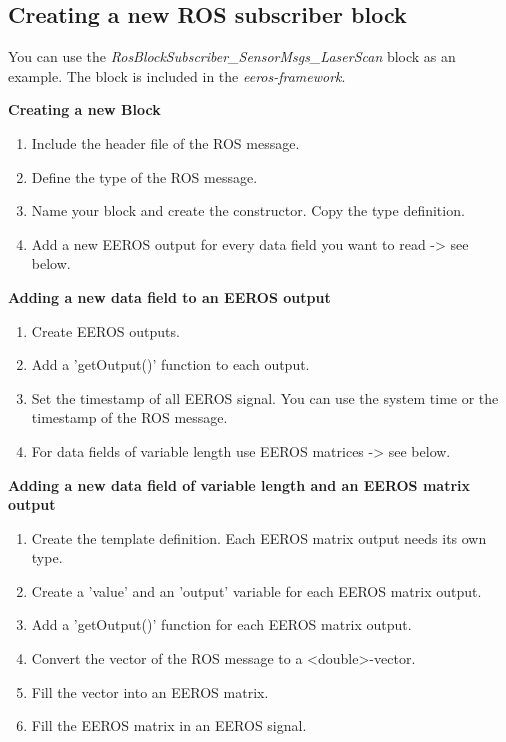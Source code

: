 \subsection{Creating a new ROS subscriber block}
\label{createRosBlock}
You can use the \textit{RosBlockSubscriber\_SensorMsgs\_LaserScan} block as an example.
The block is included in the \textit{eeros-framework}.

\textbf{Creating a new Block}
\label{creatingANewBlock}
\begin{enumerate}[\hspace{0.5cm}{A}-1]
\item Include the header file of the ROS message.
\item Define the type of the ROS message.
\item Name your block and create the constructor. Copy the type definition.
\item Add a new EEROS output for every data field you want to read -> see below.
\end{enumerate}

\textbf{Adding a new data field to an EEROS output}
\begin{enumerate}[\hspace{0.5cm}{B}-1]
\item Create EEROS outputs.
\item Add a 'getOutput()' function to each output.
\item Set the timestamp of all EEROS signal. You can use the system time or the timestamp of the ROS message.
\item For data fields of variable length use EEROS matrices -> see below.
\end{enumerate}

\textbf{Adding a new data field of variable length and an EEROS matrix output}
\begin{enumerate}[\hspace{0.5cm}{C}-1]
\item Create the template definition. Each EEROS matrix output needs its own type.
\item Create a 'value' and an 'output' variable for each EEROS matrix output.
\item Add a 'getOutput()' function for each EEROS matrix output.
\item Convert the vector of the ROS message to a <double>-vector.
\item Fill the vector into an EEROS matrix.
\item Fill the EEROS matrix in an EEROS signal.
\end{enumerate}


